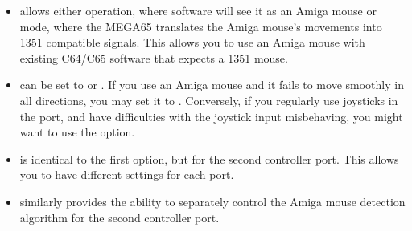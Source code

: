 \begin{itemize}
  \item {} allows either  operation,
  where software will see it as an Amiga mouse or  mode, where the MEGA65 translates the Amiga mouse's movements into 1351 compatible signals. This allows you to use an Amiga mouse with existing C64/C65 software that expects a 1351 mouse.
  \item {} can be set to  or . If you use an Amiga mouse and it fails to move smoothly in all directions, you may set it to . Conversely, if you regularly use joysticks in the port, and have difficulties with the joystick input misbehaving, you might want to use the  option.
  \item {} is identical to the first option, but for the second controller port. This allows you to have different settings for each port.
  \item {} similarly provides the ability to separately control the Amiga mouse detection algorithm for the second controller port.
\end{itemize}


